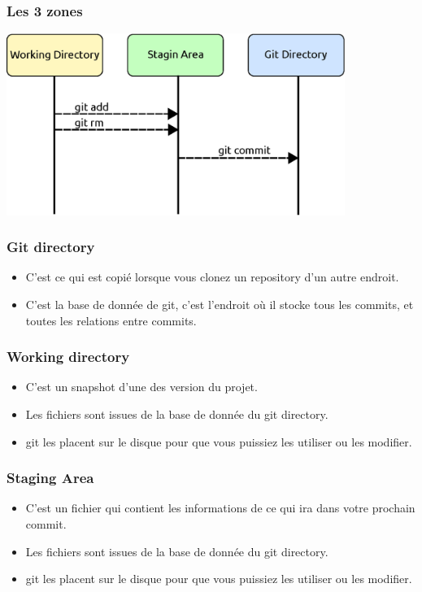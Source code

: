 \documentclass{beamer}
\begin{document}
  \begin{frame}
     \frametitle{Les 3 zones}
     \includegraphics[width=11cm]{imgs/3zones.eps}
  \end{frame}

  \begin{frame}
     \frametitle{Git directory}
     \begin{itemize}
     \item C'est ce qui est copié lorsque vous clonez un repository d'un autre endroit.
     \item C'est la base de donnée de git, c'est l'endroit où il stocke tous les commits, et toutes les relations entre commits.
     \end{itemize}
   \end{frame}

  \begin{frame}
     \frametitle{Working directory}
     \begin{itemize}
     \item C'est un snapshot d'une des version du projet.
     \item Les fichiers sont issues de la base de donnée du git directory.
     \item git les placent sur le disque pour que vous puissiez les utiliser ou les modifier.
     \end{itemize}
   \end{frame}

  \begin{frame}
     \frametitle{Staging Area}
     \begin{itemize}
     \item C'est un fichier qui contient les informations de ce qui ira dans votre prochain commit.
     \item Les fichiers sont issues de la base de donnée du git directory.
     \item git les placent sur le disque pour que vous puissiez les utiliser ou les modifier.
     \end{itemize}
   \end{frame}
\end{document}
